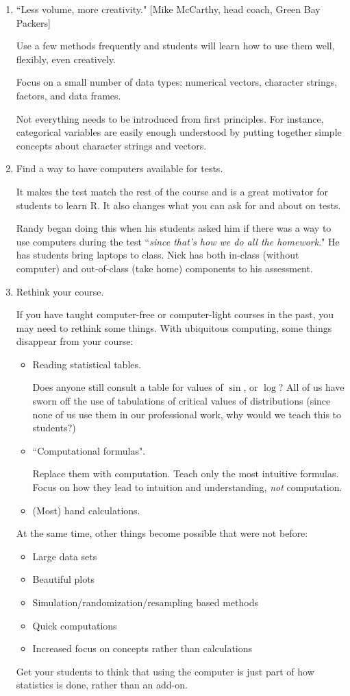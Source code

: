 \begin{enumerate}
\item ``Less volume, more creativity."  [Mike McCarthy, head coach, Green Bay Packers]

Use a few methods frequently and students will learn how to use them well, flexibly, 
even creatively. 

Focus on a small number of data types: numerical vectors, character
strings, factors, and data frames.  

Not everything needs to be introduced from first principles.  For
instance, categorical variables are easily enough understood by
putting together simple concepts about character strings and vectors.

\item
Find a way to have computers available for tests.

It makes the test match the rest of the course and is a great motivator for students
to learn R.  It also changes what you can ask for and about on tests.

Randy began doing this when his students asked him if there was a way to use computers
during the test ``\emph{since that's how we do all the homework}."  He has students 
bring laptops to class.  Nick has both in-class (without computer) and out-of-class
(take home) components to his assessment.  


\item
Rethink your course.

If you have taught computer-free or computer-light courses in the past, you may need
to rethink some things.  With ubiquitous computing, some things disappear from your 
course:
\begin{itemize}
\item
Reading statistical tables.  

Does anyone still consult a table for values of $\sin$,
or $\log$?  
All of us have sworn off the use of tabulations of critical values of
 distributions (since none of us use them in our professional work, why would we
teach this to students?)

\item
``Computational formulas".

Replace them with computation.  Teach only the most intuitive formulas. Focus on
how they lead to intuition and understanding, \emph{not} computation.

\item
(Most) hand calculations.

\end{itemize}
At the same time, other things become possible that were not before:
\begin{itemize}
\item
Large data sets
\item
Beautiful plots
\item
Simulation/randomization/resampling based methods
\item
Quick computations
\item
Increased focus on concepts rather than calculations
\end{itemize}
Get your students to think that using the computer is just part of how statistics is
done, rather than an add-on.   


\end{enumerate}
